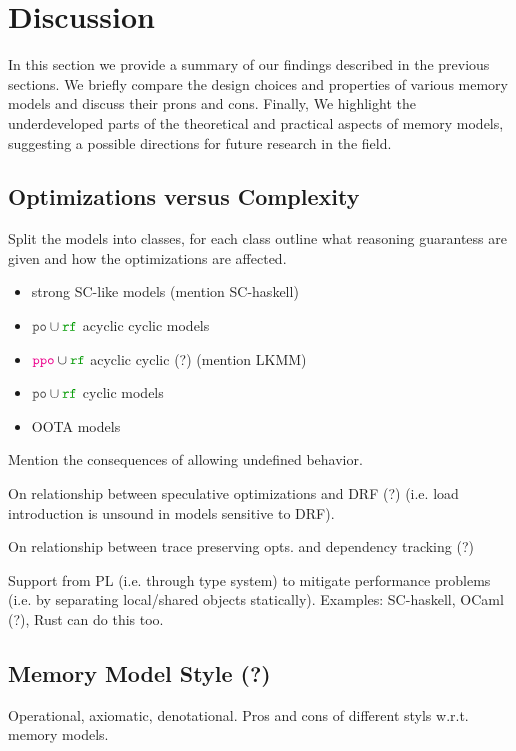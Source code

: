 \section{Discussion}
\label{sec:discussion}

In this section we provide a summary of our findings  
described in the previous sections. 
We briefly compare the design choices and properties 
of various memory models and discuss their prons and cons.
Finally, We highlight the underdeveloped parts of the theoretical
and practical aspects of memory models, suggesting 
a possible directions for future research in the field. 

\subsection{Optimizations versus Complexity} 

Split the models into classes, for each class 
outline what reasoning guarantess are given and  
how the optimizations are affected.

\begin{itemize}
  \item strong SC-like models (mention SC-haskell)
  \item $\lPO \cup \lRF$ acyclic cyclic models
  \item $\lPPO \cup \lRF$ acyclic cyclic (?) (mention LKMM)
  \item $\lPO \cup \lRF$ cyclic models
  \item OOTA models
\end{itemize}

Mention the consequences of allowing undefined behavior.

On relationship between speculative optimizations and DRF (?)
(i.e. load introduction is unsound in models sensitive to DRF).

On relationship between trace preserving opts. and dependency tracking (?)

Support from PL (i.e. through type system) to mitigate performance problems 
(i.e. by separating local/shared objects statically). 
Examples: SC-haskell, OCaml (?), Rust can do this too. 

\subsection{Memory Model Style (?)}

Operational, axiomatic, denotational. 
Pros and cons of different styls w.r.t. memory models. 

